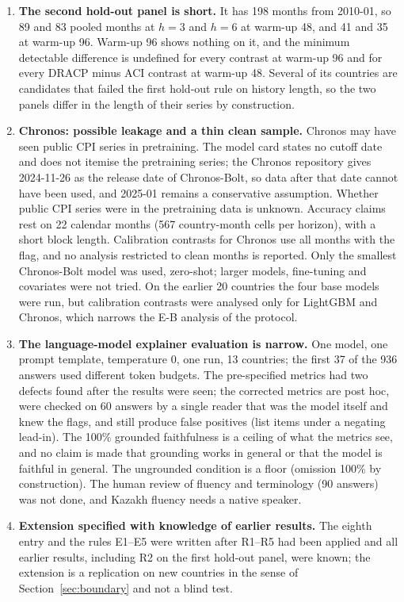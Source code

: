 \begin{enumerate}
\item \textbf{The second hold-out panel is short.} It has 198 months from 2010-01, so 89 and 83 pooled months at $h=3$ and $h=6$ at warm-up 48, and 41 and 35 at warm-up 96. Warm-up 96 shows nothing on it, and the minimum detectable difference is undefined for every contrast at warm-up 96 and for every DRACP minus ACI contrast at warm-up 48. Several of its countries are candidates that failed the first hold-out rule on history length, so the two panels differ in the length of their series by construction.
\item \textbf{Chronos: possible leakage and a thin clean sample.} Chronos may have seen public CPI series in pretraining. The model card \citep{amazon2024chronosbolt} states no cutoff date and does not itemise the pretraining series; the Chronos repository gives 2024-11-26 as the release date of Chronos-Bolt, so data after that date cannot have been used, and 2025-01 remains a conservative assumption. Whether public CPI series were in the pretraining data is unknown. Accuracy claims rest on 22 calendar months (567 country-month cells per horizon), with a short block length. Calibration contrasts for Chronos use all months with the flag, and no analysis restricted to clean months is reported. Only the smallest Chronos-Bolt model was used, zero-shot; larger models, fine-tuning and covariates were not tried. On the earlier 20 countries the four base models were run, but calibration contrasts were analysed only for LightGBM and Chronos, which narrows the E-B analysis of the protocol.
\item \textbf{The language-model explainer evaluation is narrow.} One model, one prompt template, temperature 0, one run, 13 countries; the first 37 of the 936 answers used different token budgets. The pre-specified metrics had two defects found after the results were seen; the corrected metrics are post hoc, were checked on 60 answers by a single reader that was the model itself and knew the flags, and still produce false positives (list items under a negating lead-in). The 100\% grounded faithfulness is a ceiling of what the metrics see, and no claim is made that grounding works in general or that the model is faithful in general. The ungrounded condition is a floor (omission 100\% by construction). The human review of fluency and terminology (90 answers) was not done, and Kazakh fluency needs a native speaker.
\item \textbf{Extension specified with knowledge of earlier results.} The eighth entry and the rules E1--E5 were written after R1--R5 had been applied and all earlier results, including R2 on the first hold-out panel, were known; the extension is a replication on new countries in the sense of Section~\ref{sec:boundary} and not a blind test.

\end{enumerate}
